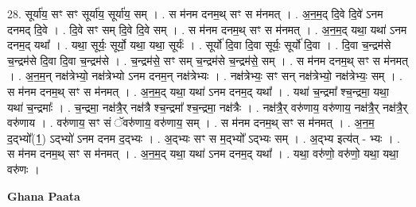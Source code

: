 \documentclass[17pt]{extarticle}
\begin{document}
28. सूर्या॑य॒ सꣳ सꣳ सूर्या॑य॒ सूर्या॑य॒ सम् । . स म॑नम दनम॒थ् सꣳ स म॑नमत् । . अ॒न॒म॒द् दि॒वे दि॒वे॑ ऽनम दनमद् दि॒वे । . दि॒वे सꣳ सम् दि॒वे दि॒वे सम् । . स म॑नम दनम॒थ् सꣳ स म॑नमत् । . अ॒न॒म॒द् यथा॒ यथा॑ ऽनम दनम॒द् यथा᳚ । . यथा॒ सूर्यः॒ सूर्यो॒ यथा॒ यथा॒ सूर्यः॑ । . सूर्यो॑ दि॒वा दि॒वा सूर्यः॒ सूर्यो॑ दि॒वा । . दि॒वा च॒न्द्रम॑से च॒न्द्रम॑से दि॒वा दि॒वा च॒न्द्रम॑से । . च॒न्द्रम॑से॒ सꣳ सम् च॒न्द्रम॑से च॒न्द्रम॑से॒ सम् । . स म॑नम दनम॒थ् सꣳ स म॑नमत् । . अ॒न॒म॒न् नक्ष॑त्रेभ्यो॒ नक्ष॑त्रेभ्यो ऽनम दनम॒न् नक्ष॑त्रेभ्यः । . नक्ष॑त्रेभ्यः॒ सꣳ सन् नक्ष॑त्रेभ्यो॒ नक्ष॑त्रेभ्यः॒ सम् । . स म॑नम दनम॒थ् सꣳ स म॑नमत् । . अ॒न॒म॒द् यथा॒ यथा॑ ऽनम दनम॒द् यथा᳚ । . यथा॑ च॒न्द्रमा᳚ श्च॒न्द्रमा॒ यथा॒ यथा॑ च॒न्द्रमाः᳚ । . च॒न्द्रमा॒ नक्ष॑त्रै॒र् नक्ष॑त्रै श्च॒न्द्रमा᳚ श्च॒न्द्रमा॒ नक्ष॑त्रैः । . नक्ष॑त्रै॒र् वरु॑णाय॒ वरु॑णाय॒ नक्ष॑त्रै॒र् नक्ष॑त्रै॒र् वरु॑णाय । . वरु॑णाय॒ सꣳ सं ॅवरु॑णाय॒ वरु॑णाय॒ सम् । . स म॑नम दनम॒थ् सꣳ स म॑नमत् । . अ॒न॒म॒ द॒द्भ्यो᳚(1॒) ऽद्भ्यो॑ ऽनम दनम द॒द्भ्यः । . अ॒द्भ्यः सꣳ स म॒द्भ्यो᳚ ऽद्भ्यः सम् । . अ॒द्भ्य इत्य॑त् - भ्यः । . स म॑नम दनम॒थ् सꣳ स म॑नमत् । . अ॒न॒म॒द् यथा॒ यथा॑ ऽनम दनम॒द् यथा᳚ । . यथा॒ वरु॑णो॒ वरु॑णो॒ यथा॒ यथा॒ वरु॑णः । \newline

\textbf{Ghana Paata } \newline
\end{document}
